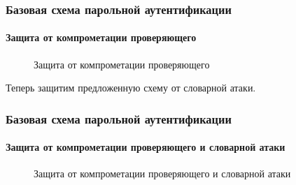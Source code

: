 \begin{frame}
\frametitle{Базовая схема парольной аутентификации}
\framesubtitle{Защита от компрометации проверяющего}
\begin{figure}
    \begin{center}
    \end{center}
    \caption{Защита от компрометации проверяющего}\label{pict:pwdhashcompr}
\end{figure} 
\end{frame}


Теперь защитим предложенную схему от словарной атаки.


\begin{frame}
\frametitle{Базовая схема парольной аутентификации}
\framesubtitle{Защита от компрометации проверяющего и словарной атаки}
\begin{figure}
    \begin{center}
    \end{center}
    \caption{Защита от компрометации проверяющего и словарной атаки}\label{pict:pwdhashcomprdict}
\end{figure} 
\end{frame}

